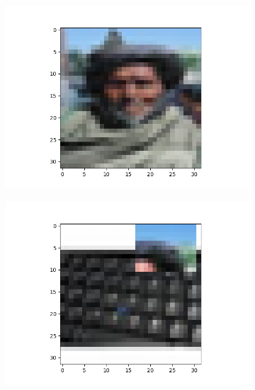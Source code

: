 \documentclass{article}
\begin{document}
\begin{figure}[h]
\begin{subfigure}{0.19\textwidth}
\end{subfigure}
\begin{subfigure}{0.19\textwidth}
\includegraphics[width=\linewidth]{figure/mixup1.png}
\end{subfigure}
\begin{subfigure}{0.19\textwidth}
\includegraphics[width=\linewidth]{figure/cutmix1.png}
\end{subfigure}
\begin{subfigure}{0.19\textwidth}

\end{subfigure}
\end{figure}
\end{document}
